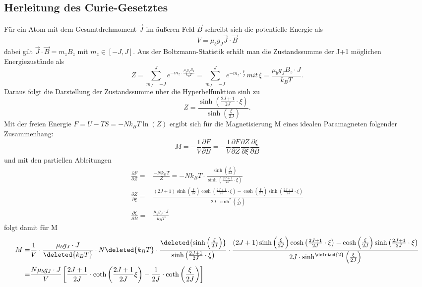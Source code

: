\documentclass[twoside,colorback,accentcolor=tud4c,11pt]{tudreport}
\begin{document}
\subsection{Herleitung des Curie-Gesetztes}
Für ein Atom mit dem Gesamtdrehmoment $\vec{J}$ im äußeren Feld $\vec{B}$ schreibt sich die potentielle Energie als
\begin{equation}
V=\mu_{b} g_{J}\vec{J}\cdot\vec{B}
\end{equation}
dabei gilt $\vec{J}\cdot\vec{B} =m_{z}B_{z}$ mit $m_{z}\in\left[-J,J\right]$. Aus der Boltzmann-Statistik erhält man die Zustandssumme der J+1 möglichen Energiezustände als
\begin{equation}
Z=\sum_{m_{J}=-J}^{J} e^{-m_{z}\cdot\frac{\mu_{b}g_{J}B_{z}}{k_{B}T}}=\sum_{m_{J}=-J}^{J} e^{-m_{z}\cdot\frac{\xi}{J}}\,mit\, \xi = \frac{\mu_{b}g_{J}B_{z}\cdot J}{k_{B}T}.
\end{equation}
Daraus folgt die Darstellung der Zustandssumme über die Hyperbelfunktion sinh zu
\begin{equation}
Z=\frac{\sinh\left(\frac{2J+1}{2J}\cdot\xi\right)}{\sinh\left(\frac{\xi}{2J}\right)}.
\end{equation}
Mit der freien Energie $F=U-TS=-Nk_{B}T\ln(Z)$ ergibt sich für die Magnetisierung M eines idealen Paramagneten folgender Zusammenhang:
\begin{equation}
M=-\frac{1}{V}\frac{\partial F}{\partial B}=-\frac{1}{V}\frac{\partial F}{\partial Z}\frac{\partial Z}{\partial \xi}\frac{\partial \xi}{\partial B}
\end{equation}
und mit den partiellen Ableitungen
\begin{align}
\frac{\partial F}{\partial Z}=&\frac{-Nk_{B}T}{Z}=-Nk_{B}T\cdot\frac{\sinh\left(\frac{\xi}{2J}\right)}{\sinh\left(\frac{2J+1}{2J}\cdot\xi\right)}\\
\frac{\partial Z}{\partial \xi}=&\frac{(2J+1)\sinh\left(\frac{\xi}{2J}\right)\cosh\left(\frac{2J+1}{2J}\cdot\xi\right)-\cosh\left(\frac{\xi}{2J}\right)\sinh\left(\frac{2J+1}{2J}\cdot\xi\right)}{2J\cdot\sinh^2\left(\frac{\xi}{2J}\right)}\\
\frac{\partial \xi}{\partial B}=&\frac{\mu_{b}g_{J}\cdot J}{k_{B}T}
\end{align}
folgt damit für M
\begin{align}
M=&\frac{1}{V}\cdot\frac{\mu_{b}g_{J}\cdot J}{\deleted{ k_{B}T}}\cdot N \deleted{k_{B}T}\cdot\frac{\deleted{\sinh\left(\frac{\xi}{2J}\right)}}{\sinh\left(\frac{2J+1}{2J}\cdot\xi\right)}\cdot\frac{(2J+1)\sinh\left(\frac{\xi}{2J}\right)\cosh\left(\frac{2J+1}{2J}\cdot\xi\right)-\cosh\left(\frac{\xi}{2J}\right)\sinh\left(\frac{2J+1}{2J}\cdot\xi\right)}{2J\cdot\sinh^{\deleted{2}}\left(\frac{\xi}{2J}\right)}\\
=&\frac{N\mu_{b}g_{J}\cdot J}{V}\left[\frac{2J+1}{2J}\cdot\coth\left(\frac{2J+1}{2J}\xi\right)-\frac{1}{2J}\cdot\coth\left(\frac{\xi}{2J}\right)\right]
\end{align}
\end{document}
